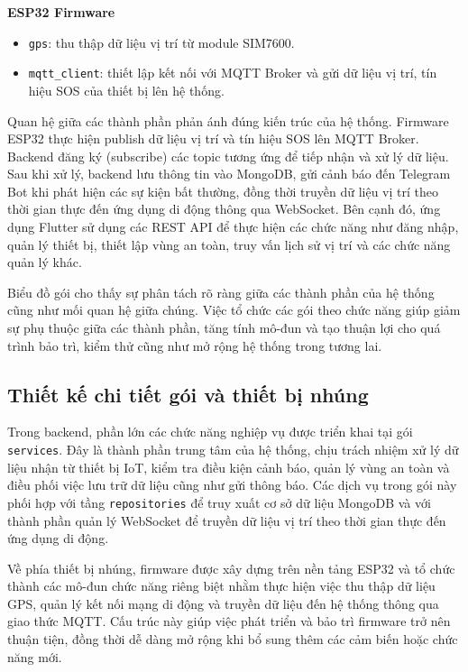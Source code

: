 \documentclass[../DoAn.tex]{subfiles}
\begin{document}
    \textbf{ESP32 Firmware}
    \begin{itemize}
        \item \texttt{gps}: thu thập dữ liệu vị trí từ module SIM7600.
        \item \texttt{mqtt\_client}: thiết lập kết nối với MQTT Broker và gửi dữ liệu vị trí, tín hiệu SOS của thiết bị lên hệ thống.
    \end{itemize}

    Quan hệ giữa các thành phần phản ánh đúng kiến trúc của hệ thống. Firmware ESP32 thực hiện publish dữ liệu vị trí và tín hiệu SOS lên MQTT Broker. Backend đăng ký (subscribe) các topic tương ứng để tiếp nhận và xử lý dữ liệu. Sau khi xử lý, backend lưu thông tin vào MongoDB, gửi cảnh báo đến Telegram Bot khi phát hiện các sự kiện bất thường, đồng thời truyền dữ liệu vị trí theo thời gian thực đến ứng dụng di động thông qua WebSocket. Bên cạnh đó, ứng dụng Flutter sử dụng các REST API để thực hiện các chức năng như đăng nhập, quản lý thiết bị, thiết lập vùng an toàn, truy vấn lịch sử vị trí và các chức năng quản lý khác.

    Biểu đồ gói cho thấy sự phân tách rõ ràng giữa các thành phần của hệ thống cũng như mối quan hệ giữa chúng. Việc tổ chức các gói theo chức năng giúp giảm sự phụ thuộc giữa các thành phần, tăng tính mô-đun và tạo thuận lợi cho quá trình bảo trì, kiểm thử cũng như mở rộng hệ thống trong tương lai.

    \subsection{Thiết kế chi tiết gói và thiết bị nhúng}

    Trong backend, phần lớn các chức năng nghiệp vụ được triển khai tại gói \texttt{services}. Đây là thành phần trung tâm của hệ thống, chịu trách nhiệm xử lý dữ liệu nhận từ thiết bị IoT, kiểm tra điều kiện cảnh báo, quản lý vùng an toàn và điều phối việc lưu trữ dữ liệu cũng như gửi thông báo. Các dịch vụ trong gói này phối hợp với tầng \texttt{repositories} để truy xuất cơ sở dữ liệu MongoDB và với thành phần quản lý WebSocket để truyền dữ liệu vị trí theo thời gian thực đến ứng dụng di động.

    Về phía thiết bị nhúng, firmware được xây dựng trên nền tảng ESP32 và tổ chức thành các mô-đun chức năng riêng biệt nhằm thực hiện việc thu thập dữ liệu GPS, quản lý kết nối mạng di động và truyền dữ liệu đến hệ thống thông qua giao thức MQTT. Cấu trúc này giúp việc phát triển và bảo trì firmware trở nên thuận tiện, đồng thời dễ dàng mở rộng khi bổ sung thêm các cảm biến hoặc chức năng mới.
\end{document}
